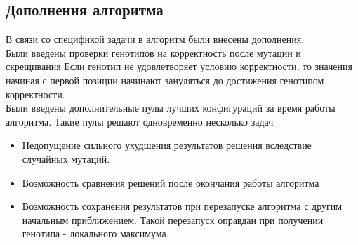 \subsection{Дополнения алгоритма}
В связи со спецификой задачи в алгоритм были внесены дополнения. 
\\Были введены проверки генотипов на корректность после мутации и скрещивания Если генотип не удовлетворяет условию корректности, то значения начиная с первой позиции начинают зануляться до достижения генотипом корректности. 
\\Были введены дополнительные пулы лучших конфигураций за время работы алгоритма. Такие пулы решают одновременно несколько задач 
\begin{itemize}
 \item Недопущение сильного ухудшения результатов решения вследствие случайных мутаций. 
 \item Возможность сравнения решений после окончания работы алгоритма
 \item Возможность сохранения результатов при перезапуске алгоритма с другим начальным приближением. Такой перезапуск оправдан при получении генотипа - локального максимума.
\end{itemize}